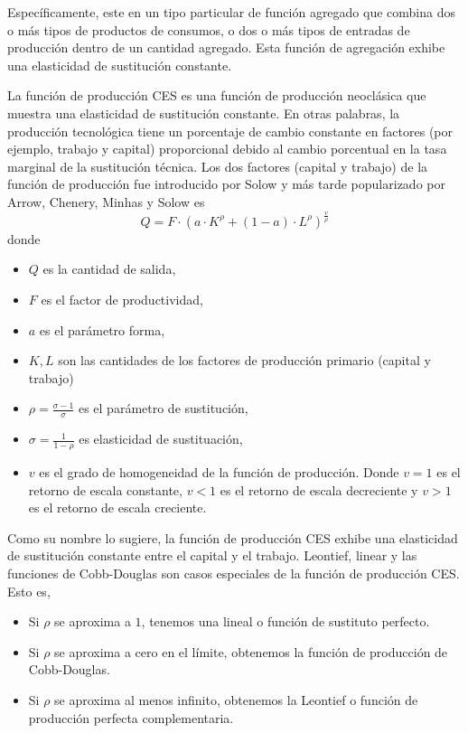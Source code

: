 Específicamente, este en un tipo particular de función agregado que combina dos o más tipos de productos de consumos, o dos o más tipos de entradas de producción dentro de un cantidad agregado. Esta función de agregación exhibe una elasticidad de sustitución constante.
\begin{definition}
La función de producción CES es una función de producción neoclásica que muestra una elasticidad de sustitución constante. En otras palabras, la producción tecnológica tiene un porcentaje de cambio constante en factores (por ejemplo, trabajo y capital) proporcional debido al cambio porcentual en la tasa marginal de la sustitución técnica. Los dos factores (capital y trabajo) de la función de producción fue introducido por Solow y más tarde popularizado por Arrow, Chenery, Minhas y Solow es
\begin{equation}
Q=F\cdot{\left(a\cdot K^{\rho}+\left(1-a\right)\cdot L^{\rho}\right)}^{\frac{v}{\rho}}
\end{equation}
donde
\begin{itemize}
	\item $Q$ es la cantidad de salida,
	\item $F$ es el factor de productividad,
	\item $a$ es el parámetro forma,
	\item $K,L$ son las cantidades de los factores de producción primario (capital y trabajo)
	\item $\rho=\frac{\sigma-1}{\sigma}$ es el parámetro de sustitución,
	\item $\sigma=\frac{1}{1-\rho}$ es elasticidad de sustituación,
	\item $v$ es el grado de homogeneidad de la función de producción. Donde $v=1$ es el retorno de escala constante, $v<1$ es el retorno de escala decreciente y $v>1$ es el retorno de escala creciente.
\end{itemize}
Como su nombre lo sugiere, la función de producción CES exhibe una elasticidad de sustitución constante entre el capital y el trabajo. Leontief, linear y las funciones de Cobb-Douglas son casos especiales de la función de producción CES. Esto es,
\begin{itemize}
	\item Si $\rho$ se aproxima a $1$, tenemos una lineal o función de sustituto perfecto.
	\item Si $\rho$ se aproxima a cero en el límite, obtenemos la función de producción de Cobb-Douglas.
	\item Si $\rho$ se aproxima al menos infinito, obtenemos la Leontief o función de producción perfecta complementaria.

\end{itemize}
\end{definition}
